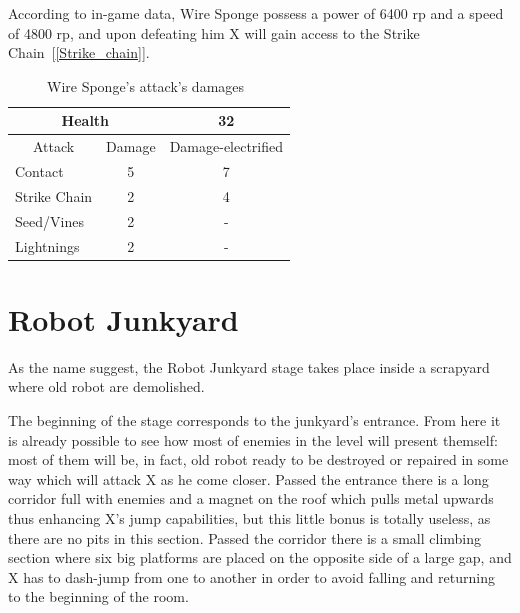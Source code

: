 According to in-game data, Wire Sponge possess a power of 6400 rp and a speed of 4800 rp, and upon defeating him X will gain access to the Strike Chain~[\ref{Strike_chain}].
\begin{table}[htp]
	\centering
	\begin{tabular}[h]{l c c}
		
		\toprule
		\multicolumn{2}{c}{Health}  & 32\\
		\midrule
		\multicolumn{1}{c}{Attack} & \multicolumn{1}{c}{Damage}& \multicolumn{1}{c}{Damage-electrified}\\
		Contact & 5 & 7\\
		Strike Chain & 2 & 4\\
		Seed/Vines& 2&-\\
		Lightnings & 2&-\\
		\bottomrule
	\end{tabular}
	\caption{Wire Sponge's attack's damages~\cite{wiki:wire_sponge}}
\end{table}

\section{Robot Junkyard}
As the name suggest, the Robot Junkyard stage takes place inside a scrapyard where old robot are demolished.

The beginning of the stage corresponds to the junkyard's entrance. From here it is already possible to see how most of enemies in the level will present themself: most of them will be, in fact, old robot ready to be destroyed or repaired in some way which will attack X as he come closer.  Passed the entrance  there is a long corridor full with enemies and a magnet on the roof which pulls metal upwards thus enhancing X's jump capabilities, but this little bonus is totally useless, as there are no pits in this section. Passed the corridor there is a small climbing section where six big platforms are placed on the opposite side of a large gap, and X has to dash-jump from one to another in order to avoid falling and returning to the beginning of the room.

